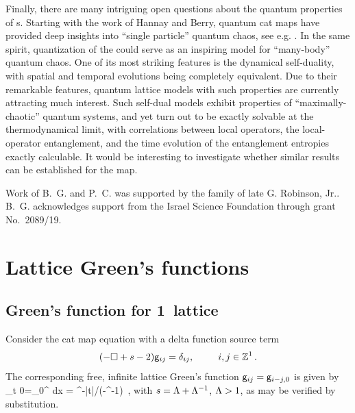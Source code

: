 \documentclass[12pt]{iopart}
\begin{document}
Finally, there are many intriguing open questions about the quantum
properties of {\catlatt}s. Starting with the work of Hannay and
Berry, quantum cat maps have provided deep insights into
``single particle'' quantum chaos, see e.g. . In the same spirit, quantization of the
{\catlatt} could serve as an inspiring model  for ``many-body'' quantum
chaos. One of its  most striking
features is the  dynamical self-duality, with spatial and temporal
evolutions being completely equivalent. Due to their remarkable features,
quantum lattice models with   such properties are currently attracting
much interest. Such self-dual models  exhibit properties of
``maximally-chaotic''  quantum systems, and
yet turn out to be exactly solvable at the thermodynamical limit, with
correlations between local operators, the local-operator
entanglement, and  the time evolution of
the entanglement entropies exactly calculable.
It would be interesting to investigate whether similar results can be
established for the {\catlatt} map.


\ack
Work of B.~G. and P.~C. was supported by the family of late G. Robinson,
Jr..  B.~G. acknowledges  support from  the Israel Science
Foundation through grant No.~2089/19.

\appendix

\section{Lattice Green's functions}
\label{sect:Green}

\subsection{Green's  function for 1\dmn\ lattice}

Consider the {cat map} equation  with a delta function
source term
\begin{equation}
 (-\Box+s-2) \mathsf{g}_{ij}=\delta_{ij}, \hspace*{25pt} i,j \in \mathbb{Z}^1
\,.
\label{GreenFun0}
\end{equation}
The corresponding free, infinite lattice Green's function $\mathsf{g}_{ij}=\mathsf{g}_{i-j, 0}$
is given by
\beq
\gd_{t 0}=\int_{0}^{\pi} dx
   = \ExpaEig^{-|t|}/(\ExpaEig-\ExpaEig^{-1})
\,,
with $s=\Lambda+\Lambda^{-1}$, $\Lambda>1$, as may be verified by
substitution.
\end{document}
